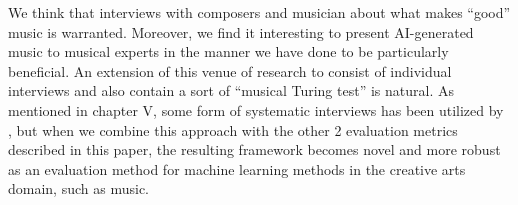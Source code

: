 \documentclass{IEEEtran}
\begin{document}
We think that interviews with composers and musician about what makes ``good'' music 
is warranted. Moreover, we find it interesting to present AI-generated 
music to musical experts in the manner we have done to be particularly beneficial. 
An extension of this venue of research to consist of individual interviews
and also contain a sort of ``musical Turing test'' is natural. As mentioned in 
chapter V, some form of systematic interviews has been utilized by \citeauthor{sturm2017taking} 
\cite{sturm2017taking}, but when we combine this approach with the other 2 evaluation metrics described in this paper, the resulting framework becomes novel and more robust as an evaluation method for machine learning methods in the creative arts domain, such as music.

\vspace{3em}

\printbibliography
\end{document}
